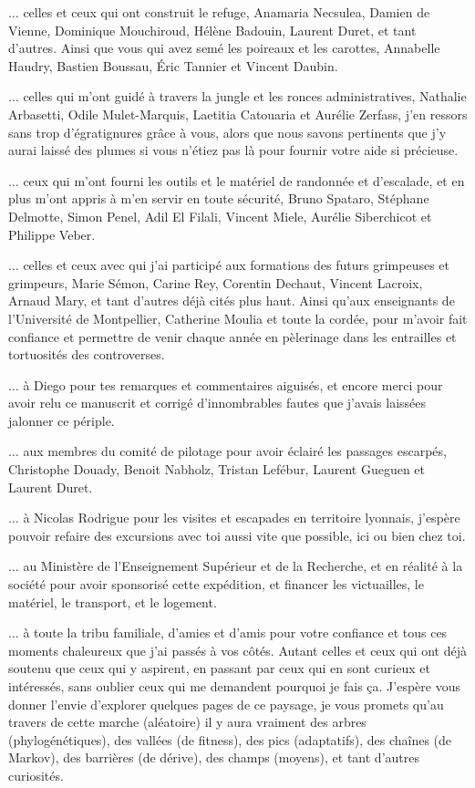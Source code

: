 $\hdots$ celles et ceux qui ont construit le refuge, Anamaria Necsulea, Damien de Vienne, Dominique Mouchiroud, Hélène Badouin, Laurent Duret, et tant d’autres.
Ainsi que vous qui avez semé les poireaux et les carottes, Annabelle Haudry, Bastien Boussau, Éric Tannier et Vincent Daubin.

$\hdots$ celles qui m’ont guidé à travers la jungle et les ronces administratives, Nathalie Arbasetti, Odile Mulet-Marquis, Laetitia Catouaria et Aurélie Zerfass, j’en ressors sans trop d’égratignures grâce à vous, alors que nous savons pertinents que j’y aurai laissé des plumes si vous n’étiez pas là pour fournir votre aide si précieuse.

$\hdots$ ceux qui m’ont fourni les outils et le matériel de randonnée et d’escalade, et en plus m’ont appris à m’en servir en toute sécurité, Bruno Spataro, Stéphane Delmotte, Simon Penel, Adil El Filali, Vincent Miele, Aurélie Siberchicot et Philippe Veber.

$\hdots$ celles et ceux avec qui j’ai participé aux formations des futurs grimpeuses et grimpeurs, Marie Sémon, Carine Rey, Corentin Dechaut, Vincent Lacroix, Arnaud Mary, et tant d’autres déjà cités plus haut.
Ainsi qu'aux enseignants de l'Université de Montpellier, Catherine Moulia et toute la cordée, pour m'avoir fait confiance et permettre de venir chaque année en pèlerinage dans les entrailles et tortuosités des controverses.

$\hdots$ à Diego pour tes remarques et commentaires aiguisés, et encore merci pour avoir relu ce manuscrit et corrigé d’innombrables fautes que j'avais laissées jalonner ce périple.

$\hdots$ aux membres du comité de pilotage pour avoir éclairé les passages escarpés, Christophe Douady, Benoit Nabholz, Tristan Lefébur, Laurent Gueguen et Laurent Duret.

$\hdots$ à Nicolas Rodrigue pour les visites et escapades en territoire lyonnais, j'espère pouvoir refaire des excursions avec toi aussi vite que possible, ici ou bien chez toi.

$\hdots$ au Ministère de l’Enseignement Supérieur et de la Recherche, et en réalité à la société pour avoir sponsorisé cette expédition, et financer les victuailles, le matériel, le transport, et le logement.

$\hdots$ à toute la tribu familiale, d’amies et d’amis pour votre confiance et tous ces moments chaleureux que j’ai passés à vos côtés.
Autant celles et ceux qui ont déjà soutenu que ceux qui y aspirent, en passant par ceux qui en sont curieux et intéressés, sans oublier ceux qui me demandent pourquoi je fais ça.
J’espère vous donner l’envie d’explorer quelques pages de ce paysage, je vous promets qu’au travers de cette marche (aléatoire) il y aura vraiment des arbres (phylogénétiques), des vallées (de fitness), des pics (adaptatifs), des chaînes (de Markov), des barrières (de dérive), des champs (moyens), et tant d’autres curiosités.

